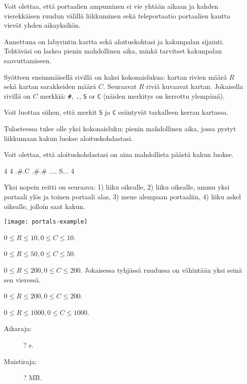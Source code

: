 \documentclass{boi2014-fi}
\newcommand{\constant}[1]{{\tt #1}}
\begin{document}
    Voit olettaa, että portaalien ampuminen ei vie yhtään aikaan ja
    kahden vierekkäisen ruudun välillä liikkuminen sekä
    teleportaatio portaalien kautta vievät yhden aikayksikön.

    \Task
    Annettuna on labyrintin kartta sekä aloituskohtasi ja kakunpalan sijainti.
    Tehtäväsi on laskea pienin mahdollinen aika,
    minkä tarvitset kakunpalan saavuttamiseen.

    \Input
    Syötteen ensimmäisellä rivillä on kaksi kokonaislukua:
    kartan rivien määrä $R$ sekä kartan sarakkeiden määrä $C$.
    Seuraavat $R$ riviä kuvaavat kartan.
    Jokaisella rivillä on $C$ merkkiä: \constant{\#},
    \constant{.}, \constant{S} or \constant{C} (näiden merkitys on kerrottu ylempänä).

    Voit luottaa siihen, että merkit \constant{S} ja \constant{C}
    esiintyvät tarkalleen kerran kartassa.

    \Output
    Tulosteessa tulee olle yksi kokonaisluku: pienin mahdollinen aika,
    jossa pystyt liikkumaan kakun luokse aloituskohdastasi.

    Voit olettaa, että aloituskohdastasi on aina mahdollista päästä kakun luokse.

    \Example
    \example
    {
        4 4\newline
        .\#.C\newline
        .\#.\#\newline
        ....\newline
        S...
    }
    {
        4
    }
    {
        Yksi nopein reitti on seuraava: 1) liiku oikealle,
        2) liiku oikealle, ammu yksi portaali ylös ja toinen portaali alas,
        3) mene alempaan portaaliin,
        4) liiku askel oikealle, jolloin saat kakun.

        \begin{center}
            \texttt{[image: portals-example]}
        \end{center}
    }

    \Scoring

    \begin{description}[leftmargin=0pt]
        \item[Osatehtävä 1 (? pistettä):] $0 \le R \le 10, 0 \le C \le 10$.
        \item[Osatehtävä 2 (? pistettä):] $0 \le R \le 50, 0 \le C \le 50$.
        \item[Osatehtävä 3 (? pistettä):] $0 \le R \le 200, 0 \le C \le 200$.
        Jokaisessa tyhjässä ruudussa on vähintään yksi seinä sen vieressä.
        \item[Osatehtävä 4 (? pistettä):] $0 \le R \le 200, 0 \le C \le 200$.
        \item[Osatehtävä 5 (? pistettä):] $0 \le R \le 1000, 0 \le C \le 1000$.
    \end{description}

    \Constraints

    \begin{description}
        \item[Aikaraja:] ? s.
        \item[Muistiraja:] ? MB.
    \end{description}
\end{document}
